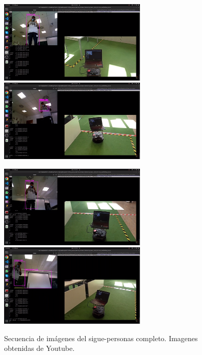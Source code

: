 \begin{figure} [H]
    \begin{center}
        \includegraphics[width=7cm]{figs/c5/fp_final1.png}
        \includegraphics[width=7cm]{figs/c5/fp_final2.png}
    \end{center}
\end{figure}
\begin{figure} [H]
    \begin{center}
        \includegraphics[width=7cm]{figs/c5/fp_final3.png}
        \includegraphics[width=7cm]{figs/c5/fp_final4.png}
    \end{center}
    \caption[Secuencia sigue-personas completo resultado final]{Secuencia de imágenes del sigue-personas completo. Imagenes obtenidas de Youtube\footnotemark.}
    \label{fig:sec_FP_final}
\end{figure}




